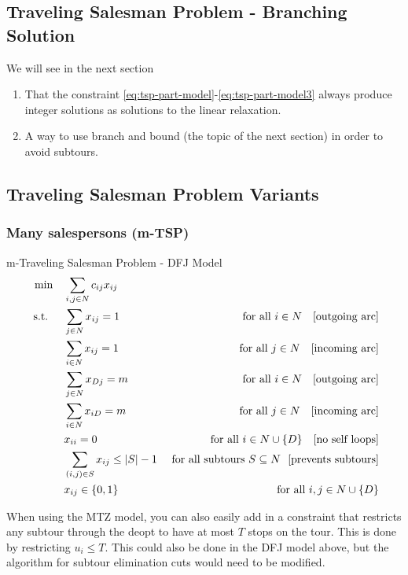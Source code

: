 \subsection{Traveling Salesman Problem - Branching Solution}
We will see in the next section
\begin{enumerate}
\item That the constraint \eqref{eq:tsp-part-model}-\eqref{eq:tsp-part-model3}  always produce integer solutions as solutions to the linear relaxation.
\item A way to use branch and bound (the topic of the next section) in order to avoid subtours.
\end{enumerate}

\subsection{Traveling Salesman Problem Variants}
\label{sec:tsp-variants}

\subsubsection{Many salespersons (m-TSP)}
\begin{general}{m-Traveling Salesman Problem - DFJ Model}{}
\begin{align}
\label{eq:tsp-DFJ-model-mtsp}
\min \quad & \sum_{i,j \in N} c_{ij} x_{ij}\\
\st \quad  & \sum_{j\in N} x_{ij} = 1 & \text{ for all } i \in N \ \ \text{ [outgoing arc]}\\
& \sum_{i \in N} x_{ij} = 1 & \text{ for all } j \in N \ \ \text{ [incoming arc]}\\
& \sum_{j\in N} x_{Dj} = m & \text{ for all } i \in N \ \ \text{ [outgoing arc]}\\
& \sum_{i \in N} x_{iD} = m & \text{ for all } j \in N \ \ \text{ [incoming arc]}\\
& x_{ii} = 0 & \text{ for all } i \in N\cup\{D\} \ \ \text{ [no self loops]} \\
& \sum_{(i,j) \in S} x_{ij} \leq |S| -1  & \text{ for all subtours } S\subseteq N \ \ \text{[prevents subtours]}\\
& x_{ij} \in \{0,1\} & \text{ for all } i,j \in N\cup\{D\}
\end{align}
\end{general}

When using the MTZ model, you can also easily add in a constraint that restricts any subtour through the deopt to have at most $T$ stops on the tour.  This is done by restricting $u_i \leq T$.  
This could also be done in the DFJ model above, but the algorithm for subtour elimination cuts would need to be modified.

